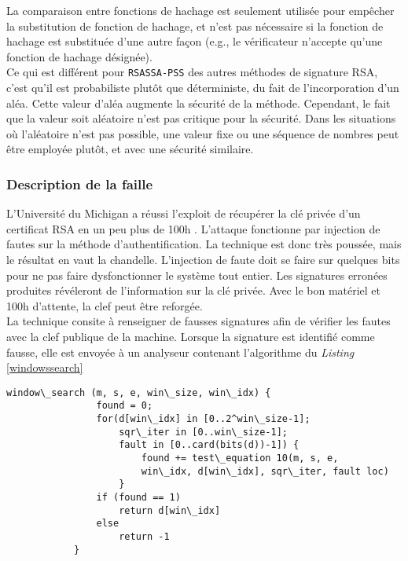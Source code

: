La comparaison entre fonctions de hachage est seulement utilisée pour empêcher la substitution de fonction de hachage, et n'est pas nécessaire si la fonction de hachage est substituée d'une autre façon (e.g., le vérificateur n'accepte qu'une fonction de hachage désignée).\\ 


Ce qui est différent pour \texttt{RSASSA-PSS} des autres méthodes de signature RSA, c'est qu'il est probabiliste plutôt que déterministe, du fait de  l'incorporation d'un aléa. Cette valeur d'aléa augmente la sécurité de la méthode. Cependant, le fait que la valeur soit aléatoire n'est pas critique pour la sécurité. Dans les situations où l'aléatoire n'est pas possible, une valeur fixe ou une séquence de nombres peut être employée plutôt, et avec une sécurité similaire.

		\subsubsection{Description de la faille}
		
			L'Université du Michigan a réussi l'exploit de récupérer la clé privée d'un certificat RSA en un peu plus de 100h \cite{andrea2010RSA} \cite{opensslvuln2010}. L'attaque fonctionne par injection de fautes \cite{fault2008lawson} sur la méthode d'authentification. La technique est donc très poussée, mais le résultat en vaut la chandelle. L'injection de faute doit se faire sur quelques bits pour ne pas faire dysfonctionner le système tout entier. Les signatures erronées produites révéleront de l'information sur la clé privée. Avec le bon matériel et 100h d'attente, la clef peut être reforgée.\\

			La technique consite à renseigner de fausses signatures afin de vérifier les fautes avec la clef publique de la machine. Lorsque la signature est identifié comme fausse, elle est envoyée à un analyseur contenant l'algorithme du \textit{Listing} \ref{windowssearch}

			\begin{lstlisting}[style=customc,caption=window\_search.c, label=windowssearch]
			window\_search (m, s, e, win\_size, win\_idx) {
				found = 0;
				for(d[win\_idx] in [0..2^win\_size-1];
					sqr\_iter in [0..win\_size-1];
					fault in [0..card(bits(d))-1]) {
						found += test\_equation 10(m, s, e,
						win\_idx, d[win\_idx], sqr\_iter, fault loc)
					}
				if (found == 1) 
					return d[win\_idx]
				else 
					return -1
			}
			\end{lstlisting}

